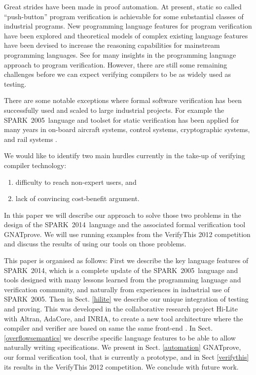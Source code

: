 \documentclass[sttt,draft]{svjour}
\newcommand{\hilite}{Hi-Lite}
\newcommand{\gnatprove}{GNATprove\xspace}
\newcommand{\oldspark}{SPARK~2005\xspace}
\newcommand{\newspark}{SPARK~2014\xspace}
\begin{document}
Great strides have been made in proof automation. At present, static
so called ``push-button'' program verification is achievable for some
substantial classes of industrial programs. New programming language
features for program verification have been explored and theoretical
models of complex existing language features have been devised to
increase the reasoning capabilities for mainstream programming
languages. See \cite{HatcliffLLMP12} for many insights in the
programming language approach to program verification. However, there
are still some remaining challenges before we can expect verifying
compilers to be as widely used as testing.

There are some notable exceptions where formal software verification
has been successfully used and scaled to large industrial projects. For
example the \oldspark\ language and toolset for static verification
has been applied for many years in on-board aircraft systems, control
systems, cryptographic systems, and rail systems
\cite{sparkbook2012,oneill2012}.

We would like to identify two main hurdles currently in the take-up of
verifying compiler technology:
%
\begin{enumerate}
\item difficulty to reach non-expert users, and
\item lack of convincing cost-benefit argument.
\end{enumerate}
%
In this paper we will describe our approach to solve those two
problems in the design of the \newspark\ language and the associated
formal verification tool \gnatprove. We will use running examples from
the VerifyThis 2012 competition and discuss the results of using our
tools on those problems.

This paper is organised as follows: First we describe the key language
features of \newspark, which is a complete update of the
\oldspark\ language and tools designed with many lessons learned from
the programming language and verification community, and naturally
from experiences in industrial use of \oldspark. Then in
Sect. \ref{hilite} we describe our unique integration of testing and
proving. This was developed in the collaborative research project
\hilite\ \cite{hiliteERTS2012} with Altran, AdaCore, and INRIA, to
create a new tool architecture where the compiler and verifier are based on same the
same front-end \cite{ksd2012}. In Sect. \ref{overflowsemantics} we
describe specific language features to be able to allow naturally
writing specifications. We present in Sect. \ref{automation}
GNATprove, our formal verification tool, that is currently a
prototype, and in Sect \ref{verifythis} its results in the VerifyThis
2012 competition. We conclude with future work.
\end{document}
